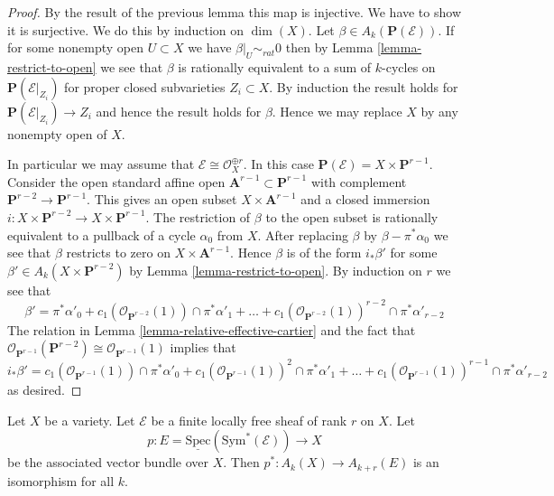 \begin{proof}
By the result of the previous lemma this map is injective.
We have to show it is surjective. We do this by induction
on $\dim(X)$. Let $\beta \in A_k(\mathbf{P}(\mathcal{E}))$.
If for some nonempty open $U \subset X$ we have $\beta|_U \sim_{rat} 0$
then by Lemma \ref{lemma-restrict-to-open} we see that $\beta$
is rationally equivalent to
a sum of $k$-cycles on $\mathbf{P}(\mathcal{E}|_{Z_i})$ for proper
closed subvarieties $Z_i \subset X$. By induction the result holds
for $\mathbf{P}(\mathcal{E}|_{Z_i}) \to Z_i$ and hence the
result holds for $\beta$. Hence we may replace $X$ by any nonempty
open of $X$.

\medskip\noindent
In particular we may assume that $\mathcal{E} \cong \mathcal{O}_X^{\oplus r}$.
In this case $\mathbf{P}(\mathcal{E}) = X \times \mathbf{P}^{r - 1}$.
Consider the open standard affine open
$\mathbf{A}^{r - 1} \subset \mathbf{P}^{r - 1}$ with complement
$\mathbf{P}^{r - 2} \to \mathbf{P}^{r - 1}$.
This gives an open subset $X \times \mathbf{A}^{r - 1}$ and a
closed immersion
$i : X \times \mathbf{P}^{r - 2} \to X \times \mathbf{P}^{r - 1}$.
The restriction of $\beta$ to the open subset is rationally equivalent
to a pullback of a cycle $\alpha_0$ from $X$. After replacing
$\beta$ by $\beta - \pi^*\alpha_0$ we see that $\beta$ restricts
to zero on $X \times \mathbf{A}^{r - 1}$. Hence $\beta$ is
of the form $i_*\beta'$ for some $\beta' \in A_k(X \times \mathbf{P}^{r - 2})$
by Lemma \ref{lemma-restrict-to-open}. By induction on $r$ we see that
$$
\beta' =
\pi^*\alpha'_0 +
c_1(\mathcal{O}_{\mathbf{P}^{r - 2}}(1)) \cap \pi^*\alpha'_1 + \ldots +
c_1(\mathcal{O}_{\mathbf{P}^{r - 2}}(1))^{r - 2} \cap \pi^*\alpha'_{r-2}
$$
The relation in Lemma \ref{lemma-relative-effective-cartier}
and the fact that
$\mathcal{O}_{\mathbf{P}^{r - 1}}(\mathbf{P}^{r - 2})
\cong \mathcal{O}_{\mathbf{P}^{r - 1}}(1)$ implies
that
$$
i_*\beta' =
c_1(\mathcal{O}_{\mathbf{P}^{r - 1}}(1)) \cap \pi^*\alpha'_0 +
c_1(\mathcal{O}_{\mathbf{P}^{r - 1}}(1))^2 \cap \pi^*\alpha'_1 + \ldots +
c_1(\mathcal{O}_{\mathbf{P}^{r - 1}}(1))^{r - 1} \cap \pi^*\alpha'_{r-2}
$$
as desired.
\end{proof}

\begin{lemma}
Let $X$ be a variety.
Let $\mathcal{E}$ be a finite locally free sheaf of rank $r$ on $X$.
Let
$$
p :
E = \underline{\text{Spec}}(\text{Sym}^*(\mathcal{E}))
\longrightarrow
X
$$
be the associated vector bundle over $X$.
Then $p^* : A_k(X) \to A_{k + r}(E)$ is an isomorphism for all $k$.
\end{lemma}

